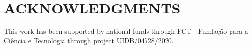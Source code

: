 \documentclass{aip-cp}
\begin{document}
\section{ACKNOWLEDGMENTS}
This work has been supported by national funds through FCT - Fundação para a Ciência e Tecnologia through project UIDB/04728/2020.


\nocite{*}
%
%
\end{document}
